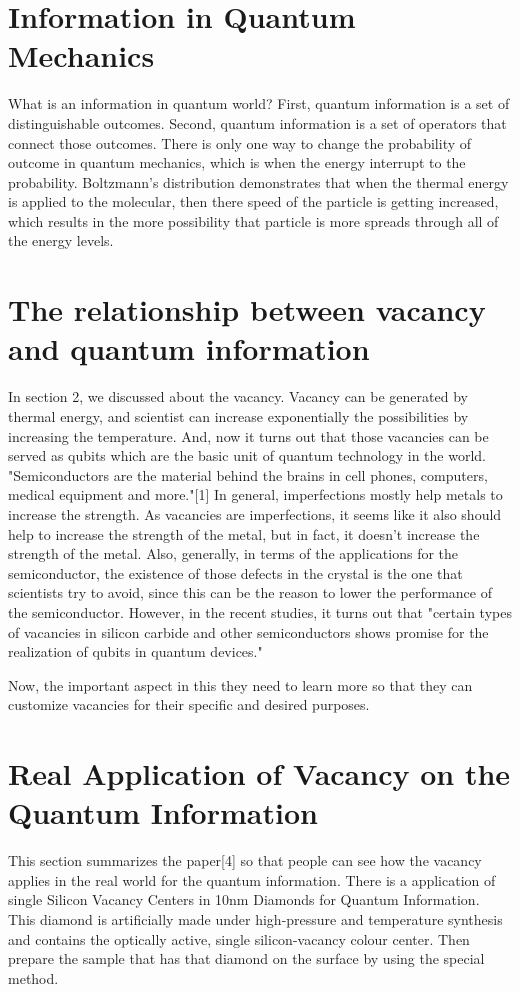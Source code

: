 \documentclass{article}
\begin{document}
\section{Information in Quantum Mechanics}
What is an information in quantum world? 
First, quantum information is a set of distinguishable outcomes.
Second, quantum information is a set of operators that connect those
outcomes.
There is only one way to change the probability of outcome in quantum mechanics, which is when the energy interrupt to the probability. 
Boltzmann's distribution demonstrates that when the thermal energy is applied to the molecular, then there speed of the particle is getting increased, which results in the more possibility that particle is more spreads through all of the energy levels. 

\section{The relationship between vacancy and quantum information}
In section 2, we discussed about the vacancy. Vacancy can be generated by thermal energy, and scientist can increase exponentially the possibilities by increasing the temperature. And, now it turns out that those vacancies can be served as qubits which are the basic unit of quantum technology in the world. "Semiconductors are the material behind the brains in cell phones, computers, medical equipment and more."[1] In general, imperfections mostly help metals to increase the strength. As vacancies are imperfections, it seems like it also should help to increase the strength of the metal, but in fact, it doesn't increase the strength of the metal.
Also, generally, in terms of the applications for the semiconductor, the existence of those defects in the crystal is the one that scientists try to avoid, since this can be the reason to lower the performance of the semiconductor. 
However, in the recent studies, it turns out that "certain types of vacancies in silicon carbide and other semiconductors shows promise for the realization of qubits in quantum devices." 

Now, the important aspect in this they need to learn more so that they can customize vacancies for their specific and desired purposes. 

\section{Real Application of Vacancy on the Quantum Information}
This section summarizes the paper[4] so that people can see how the vacancy applies in the real world for the quantum information. 
There is a application of single Silicon Vacancy Centers in 10nm Diamonds for Quantum Information. \\
This diamond is artificially made under high-pressure and temperature synthesis and contains the optically active, single silicon-vacancy colour center. Then prepare the sample that has that diamond on the surface by using the special method. \\
\end{document}
